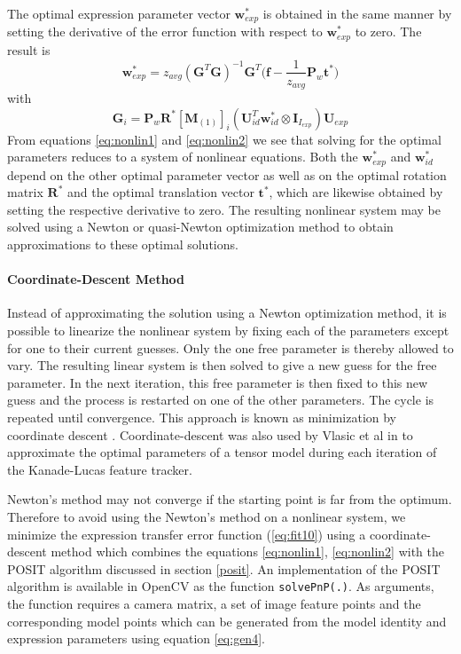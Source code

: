 \documentclass[11pt,a4paper,twoside]{report}
\begin{document}
The optimal expression parameter vector $\mathbf{w}^*_{exp}$ is obtained in the
same manner by setting the derivative of the error function with respect to
$\mathbf{w}^*_{exp}$ to zero. The result is 
\begin{equation}\label{eq:nonlin2}
\mathbf{w}^*_{exp} = z_{avg}(\mathbf{G}^T\mathbf{G})^{-1}\mathbf{G}^T\bigl(\mathbf{f} - \frac{1}{z_{avg}}\mathbf{P}_w\mathbf{t}^*\bigr)
\end{equation}
with 
\begin{equation}\label{eq:G}
\mathbf{G}_i =
\mathbf{P}_w\mathbf{R}^*[\mathbf{M}_{(1)}]_{i}(\mathbf{U}_{id}^T\mathbf{w}^*_{id}
\otimes \mathbf{I}_{I_{exp}})\mathbf{U}_{exp}
\end{equation}
From equations \ref{eq:nonlin1} and \ref{eq:nonlin2} we see that solving for
the optimal parameters reduces to a system of nonlinear equations. Both the
$\mathbf{w}^*_{exp}$ and $\mathbf{w}^*_{id}$ depend on the other optimal parameter vector as
well as on the optimal rotation matrix $\mathbf{R}^*$ and the optimal translation
vector $\mathbf{t}^*$, which are likewise obtained by setting the respective
derivative to zero. The resulting nonlinear system may be solved using a Newton or
quasi-Newton optimization method to obtain approximations to these optimal solutions.

\paragraph{Coordinate-Descent Method}
Instead of approximating the solution using a Newton optimization method, it is
possible to linearize the nonlinear system by fixing each of the parameters
except for one to their current guesses. Only the one free parameter is thereby
allowed to vary. The resulting linear system is then solved
to give a new guess for the free parameter. In the next iteration, this free parameter is then fixed to
this new guess and the process is restarted on one of the other parameters. The cycle
is repeated until convergence. This approach is known as minimization by coordinate
descent \cite{Press1992}. Coordinate-descent was also used by Vlasic et al in \cite{faceTransfer05}
to approximate the optimal parameters of a tensor model during each iteration of
the Kanade-Lucas feature tracker.

Newton's method may not converge if the starting point is far from the
optimum. Therefore to avoid using the Newton's method on a nonlinear system, we
minimize the expression transfer error function (\ref{eq:fit10}) using
a coordinate-descent method which combines the equations
\ref{eq:nonlin1}, \ref{eq:nonlin2} with the POSIT algorithm discussed in section
\ref{posit}. An implementation of the POSIT algorithm is available in OpenCV as
the function \texttt{solvePnP(.)}. As arguments, the function requires a camera matrix, a set of image
feature points and the corresponding model points which can be generated from
the model identity and expression parameters using equation \ref{eq:gen4}.
\end{document}
